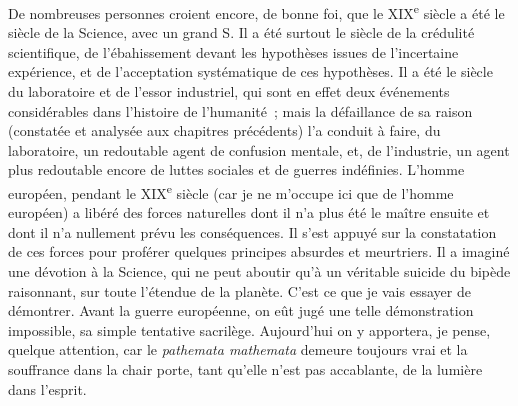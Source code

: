 \documentclass[french,twoside]{book} %
\newcommand\chaptercont{} %
\begin{document}
\chaptercont
\noindent De nombreuses personnes croient encore, de bonne foi, que le XIX\textsuperscript{e} siècle a été le siècle de la Science, avec un grand S. Il a été surtout le siècle de la crédulité scientifique, de l’ébahissement devant les hypothèses issues de l’incertaine expérience, et de l’acceptation systématique de ces hypothèses. Il a été le siècle du laboratoire et de l’essor industriel, qui sont en effet deux événements considérables dans l’histoire de l’humanité ; mais la défaillance de sa raison (constatée et analysée aux chapitres précédents) l’a conduit à faire, du laboratoire, un redoutable agent de confusion mentale, et, de l’industrie, un agent plus redoutable encore de luttes sociales et de guerres indéfinies. L’homme européen, pendant le XIX\textsuperscript{e} siècle (car je ne m’occupe ici que de l’homme européen) a libéré des forces naturelles dont il n’a plus été le maître ensuite et dont il n’a nullement prévu les conséquences. Il s’est appuyé sur la constatation de ces forces pour proférer quelques principes absurdes et meurtriers. Il a imaginé une dévotion à la Science, qui ne peut aboutir qu’à un véritable suicide du bipède raisonnant, sur toute l’étendue de la planète. C’est ce que je vais essayer de démontrer. Avant la guerre européenne, on eût jugé une telle démonstration impossible, sa simple tentative sacrilège. Aujourd’hui on y apportera, je pense, quelque attention, car le {\itshape pathemata mathemata} demeure toujours vrai et la souffrance dans la chair porte, tant qu’elle n’est pas accablante, de la lumière dans l’esprit.\par
\end{document}
